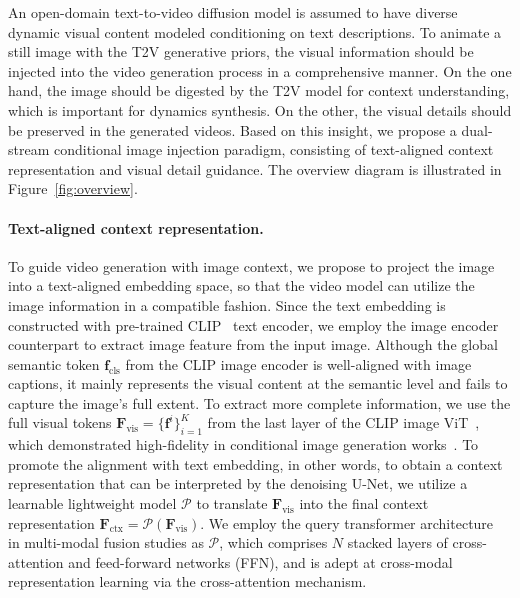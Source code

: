 An open-domain text-to-video diffusion model is assumed to have diverse dynamic visual content modeled conditioning on text descriptions.
To animate a still image with the T2V generative priors, the visual information should be injected into the video generation process in a comprehensive manner.
On the one hand, the image should be digested by the T2V model for context understanding, which is important for dynamics synthesis. On the other, the visual details should be preserved in the generated videos.
Based on this insight, we propose a dual-stream conditional image injection paradigm, consisting of text-aligned context representation and visual detail guidance. The overview diagram is illustrated in Figure~\ref{fig:overview}.

\vspace{-4mm}
\paragraph{Text-aligned context representation.}
To guide video generation with image context, we propose to project the image into a text-aligned embedding space, so that the video model can utilize the image information in a compatible fashion. 
Since the text embedding is constructed with pre-trained CLIP~\cite{radford2021learning} text encoder, we employ the image encoder counterpart to extract image feature from the input image. Although the global semantic token $\mathbf{f}_{\text{cls}}$ from the CLIP image encoder is well-aligned with image captions, it mainly represents the visual content at the semantic level and fails to capture the image's full extent.
To extract more complete information, we use the full visual tokens $\mathbf{F}_{\text{vis}}=\{\mathbf{f}^i\}^K_{i=1}$ from the last layer of the CLIP image ViT~\cite{dosovitskiy2020image}, which demonstrated high-fidelity in conditional image generation works~\cite{shi2023instancebooth,ye2023ipadapter}.
To promote the alignment with text embedding, in other words, to obtain a context representation that can be interpreted by the denoising U-Net, we utilize a learnable lightweight model $\mathcal{P}$ to translate $\mathbf{F}_{\text{vis}}$ into the final context representation $\mathbf{F}_{\text{ctx}}=\mathcal{P}(\mathbf{F}_{\text{vis}})$. We employ the query transformer architecture~\cite{jaegle2021perceiver,awadalla2023openflamingo} in multi-modal fusion studies as $\mathcal{P}$, which comprises $N$ stacked layers of cross-attention and feed-forward networks (FFN), and is adept at cross-modal representation learning via the cross-attention mechanism.

